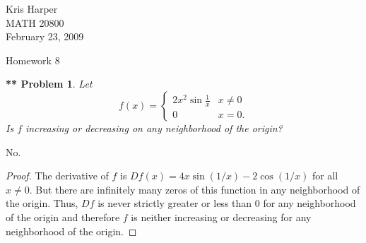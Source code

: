 \documentclass{article}
\newtheorem{**}{** Problem}
\begin{document}
\begin{flushright}
Kris Harper\\

MATH 20800\\

February 23, 2009
\end{flushright}

\begin{center}
Homework 8
\end{center}

\begin{flushleft}

\begin{**}
Let
\[
f(x) =
\begin{cases}
2x^2 \sin \frac{1}{x} & x \neq 0\\
0 & x = 0.
\end{cases}
\]
Is $f$ increasing or decreasing on any neighborhood of the origin?
\end{**}

No.
\begin{proof}
The derivative of $f$ is $Df(x) = 4x \sin (1/x) - 2 \cos (1/x)$ for all $x \neq 0$. But there are infinitely many zeros of this function in any neighborhood of the origin. Thus, $Df$ is never strictly greater or less than $0$ for any neighborhood of the origin and therefore $f$ is neither increasing or decreasing for any neighborhood of the origin.
\end{proof}


\end{flushleft}
\end{document}
